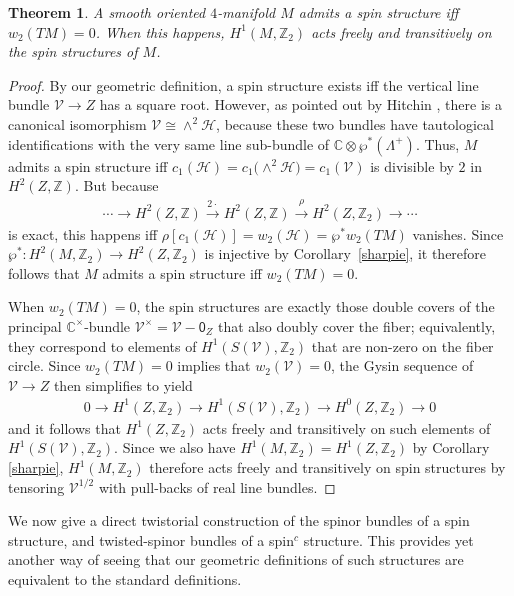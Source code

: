 \documentclass[pdftex]{sigma}
\numberwithin{equation}{section}
\newtheorem{Theorem}{Theorem}[section]
\def\CC{\mathbb{C}}
\def\ZZ{\mathbb{Z}}
\begin{document}
\begin{Theorem} A smooth oriented $4$-manifold $M$ admits a spin structure
iff $w_2(TM)=0$. When this happens, $H^1(M, \ZZ_2)$ acts freely and transitively
on the spin structures of $M$.
\end{Theorem}
\begin{proof}
By our geometric definition, a spin structure exists iff the vertical line bundle $\mathscr{V}\to Z$
has a square root. However, as pointed out by Hitchin \cite{hitka}, there is a canonical isomorphism
$\mathscr{V} \cong \wedge^2\mathscr{H}$, because these two bundles have tautological identifications with the very same
line sub-bundle of $\CC\otimes \wp^*( \Lambda^+)$. Thus, $M$ admits a spin structure iff
$c_1 (\mathscr{H})= c_1 \big({\wedge}^2\mathscr{H}\big) = c_1(\mathscr{V})$ is divisible by $2$ in $H^2(Z,\ZZ)$.
But because
\begin{gather*}
\cdots \to H^2 (Z,\ZZ) \stackrel{2\cdot}{\to} H^2 (Z,\ZZ) \stackrel{\rho}{\to} H^2 (Z,\ZZ_2) \to \cdots
\end{gather*}
is exact, this happens iff $\rho [c_1 (\mathscr{H})] = w_2 (\mathscr{H}) = \wp^* w_2(TM)$
vanishes. Since $\wp^* \colon H^2(M, \ZZ_2) \to H^2(Z, \ZZ_2)$ is injective by Corollary~\ref{sharpie},
it therefore follows that $M$ admits a spin structure iff $w_2(TM)=0$.

When $w_2(TM)=0$,
the spin structures are exactly those double covers of the principal $\CC^\times$-bundle $\mathscr{V}^\times = \mathscr{V}-\mathsf{0}_Z$ that also doubly cover
the fiber; equivalently, they correspond to elements of $H^1(S(\mathscr{V}), \ZZ_2)$ that are non-zero on the
fiber circle. Since $w_2(TM)=0$ implies that $w_2(\mathscr{V})=0$, the Gysin sequence
of $\mathscr{V}\to Z$ then simplifies to yield
\begin{gather*}
0\to H^1 (Z , \ZZ_2) \to H^1(S(\mathscr{V}), \ZZ_2) \to H^0 (Z, \ZZ_2) \to 0
\end{gather*}
and it follows that $H^1 (Z , \ZZ_2)$ acts freely and transitively on such elements of $H^1(S(\mathscr{V}), \ZZ_2)$.
Since we also have $H^1(M, \ZZ_2) = H^1(Z,\ZZ_2)$ by Corollary \ref{sharpie},
$H^1(M, \ZZ_2)$ therefore acts freely and transitively on spin structures by tensoring $\mathscr{V}^{1/2}$ with pull-backs
of real line bundles. \end{proof}

We now give a direct twistorial construction of the spinor bundles of a spin structure, and twisted-spinor bundles of
a spin$^c$ structure. This provides yet another way of seeing that our geometric definitions of
such structures are equivalent to the standard definitions.
\end{document}
